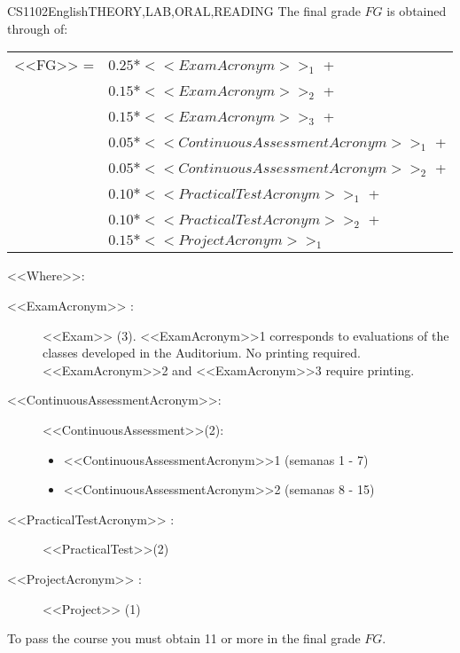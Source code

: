   \begin{evaluation}{CS1102}{English}{THEORY,LAB,ORAL,READING}
  The final grade $FG$ is obtained through of:
 
\begin{tabular}{cl}
    <<FG>> =  & $0.25*<<ExamAcronym>>_{1}$ +\\
              & $0.15*<<ExamAcronym>>_{2}$ +\\
              & $0.15*<<ExamAcronym>>_{3}$ +\\
              & $0.05*<<ContinuousAssessmentAcronym>>_{1}$ +\\
              & $0.05*<<ContinuousAssessmentAcronym>>_{2}$ +\\
              & $0.10*<<PracticalTestAcronym>>_{1}$ +\\
              & $0.10*<<PracticalTestAcronym>>_{2}$ + \\
              & $0.15*<<ProjectAcronym>>_{1}$
  \end{tabular}

  \noindent <<Where>>:
  \begin{description}
      \item[<<ExamAcronym>> :] <<Exam>> (3). <<ExamAcronym>>1 corresponds to evaluations of the classes developed in the Auditorium. No printing required. <<ExamAcronym>>2 and  <<ExamAcronym>>3 require printing.
      \item[<<ContinuousAssessmentAcronym>>:]<<ContinuousAssessment>>(2):
         \begin{itemize}
             \item <<ContinuousAssessmentAcronym>>1 (semanas 1 - 7) 
             \item <<ContinuousAssessmentAcronym>>2 (semanas 8 - 15)
       \end{itemize}
  \item[<<PracticalTestAcronym>> :] <<PracticalTest>>(2)
  \item[<<ProjectAcronym>> :] <<Project>> (1)
  \end{description}
 
  \noindent To pass the course you must obtain 11 or more in the final grade $FG$.
  \end{evaluation}
 
 
 
